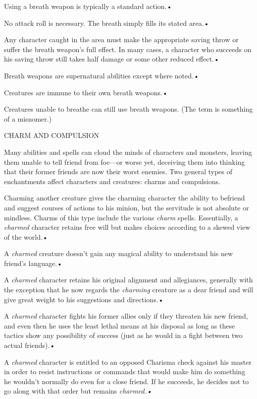 \documentclass{article}
\begin{document}
\parindent=3pt
Using a breath weapon is typically a standard action.• 

No attack roll is necessary. The breath simply fills its stated area.• 

\parindent=7pt
Any character caught in the area must make the appropriate saving throw or suffer 
the breath weapon's full effect. In many cases, a character who succeeds on his 
saving throw still takes half damage or some other reduced effect.• 

\parindent=3pt
Breath weapons are supernatural abilities except where noted.• 

Creatures are immune to their own breath weapons.• 

\parindent=7pt
Creatures unable to breathe can still use breath weapons. (The term is something 
of a misnomer.)

\vspace{12pt}
\parindent=0pt
CHARM AND COMPULSION

Many abilities and spells can cloud the minds of characters and monsters, leaving 
them unable to tell friend from foe---or worse yet, deceiving them into thinking 
that their former friends are now their worst enemies. Two general types of enchantments 
affect characters and creatures: charms and compulsions.

Charming another creature gives the charming character the ability to befriend 
and suggest courses of actions to his minion, but the servitude is not absolute 
or mindless. Charms of this type include the various \textit{charm }spells. Essentially, 
a \textit{charmed }character retains free will but makes choices according to a 
skewed view of the world.• 

\parindent=3pt
A \textit{charmed }creature doesn't gain any magical ability to understand his 
new friend's language.• 

A \textit{charmed }character retains his original alignment and allegiances, generally 
with the exception that he now regards the \textit{charming }creature as a dear 
friend and will give great weight to his suggestions and directions.• 

A \textit{charmed }character fights his former allies only if they threaten his 
new friend, and even then he uses the least lethal means at his disposal as long 
as these tactics show any possibility of success (just as he would in a fight between 
two actual friends).• 

A \textit{charmed }character is entitled to an opposed Charisma check against his 
master in order to resist instructions or commands that would make him do something 
he wouldn't normally do even for a close friend. If he succeeds, he decides not 
to go along with that order but remains \textit{charmed.• }
\end{document}
